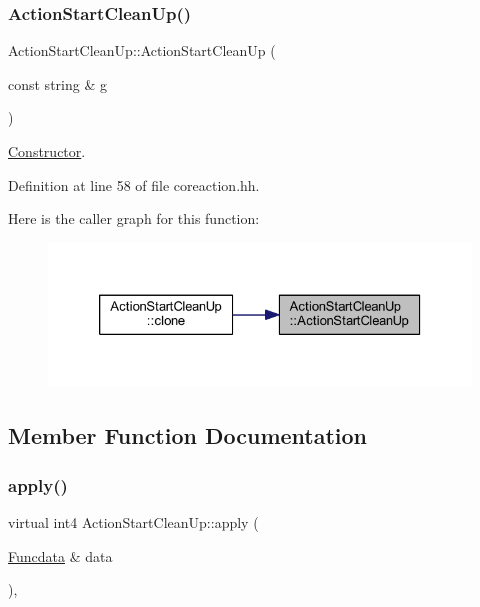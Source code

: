 \subsubsection{\texorpdfstring{ActionStartCleanUp()}{ActionStartCleanUp()}}
{\footnotesize\ttfamily Action\+Start\+Clean\+Up\+::\+Action\+Start\+Clean\+Up (\begin{DoxyParamCaption}\item[{const string \&}]{g }\end{DoxyParamCaption})\hspace{0.3cm}{\ttfamily [inline]}}



\mbox{\hyperlink{class_constructor}{Constructor}}. 



Definition at line 58 of file coreaction.\+hh.

Here is the caller graph for this function\+:
\nopagebreak
\begin{figure}[H]
\begin{center}
\leavevmode
\includegraphics[width=326pt]{class_action_start_clean_up_a54bd9985580eb352ff524ed08308b77c_icgraph}
\end{center}
\end{figure}


\subsection{Member Function Documentation}
\mbox{\label{class_action_start_clean_up_a169a82db1316093f0e368a34d2df8538}} 
\subsubsection{\texorpdfstring{apply()}{apply()}}
{\footnotesize\ttfamily virtual int4 Action\+Start\+Clean\+Up\+::apply (\begin{DoxyParamCaption}\item[{\mbox{\hyperlink{class_funcdata}{Funcdata}} \&}]{data }\end{DoxyParamCaption})\hspace{0.3cm}{\ttfamily [inline]}, {\ttfamily [virtual]}}



